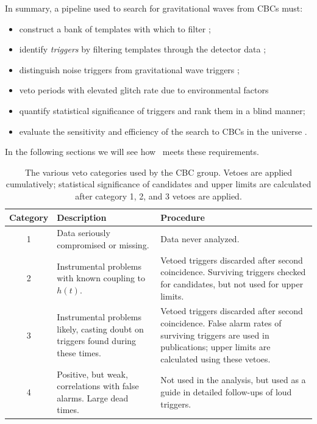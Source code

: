 In summary, a pipeline used to search for gravitational waves from \acp{CBC} must:
\begin{itemize}
\item{construct a bank of templates with which to filter \cite{Owen:1998dk, Tanaka:2000, BBCCS:2006, hexabank};}
\item{identify \emph{triggers} by filtering templates through the detector data \cite{Brown};}
\item{distinguish noise triggers from gravitational wave triggers \cite{Allen:2004};}
\item{veto periods with elevated glitch rate due to environmental factors \cite{Slutsky:2010ff, Christensen:2010}}
\item{quantify statistical significance of triggers and rank them in a blind manner;}
\item{evaluate the sensitivity and efficiency of the search to \acp{CBC} in the universe \cite{Collaboration:2009tt, Abbott:2009qj, Collaboration:S6CBClowmass}.}
\end{itemize}
In the following sections we will see how \ihope~meets these requirements.

\begin{table}
\label{tab:veto_cats}
\center
\begin{tabular}{c | p{5cm} | p{8cm}}
Category    &    Description    &   Procedure    \\
\hline
    1       &    Data seriously compromised or missing.    &    Data never analyzed. \\
\hline
    2       &    Instrumental problems with known coupling to $h(t)$.    &    Vetoed triggers discarded after second coincidence. Surviving triggers checked for candidates, but not used for upper limits. \\
\hline
    3       &    Instrumental problems likely, casting doubt on triggers found during these times.    &    Vetoed triggers discarded after second coincidence. False alarm rates of surviving triggers are used in publications; upper limits are calculated using these vetoes.  \\
\hline
    4       &    Positive, but weak, correlations with false alarms. Large dead times.    &     Not used in the analysis, but used as a guide in detailed follow-ups of loud triggers. \\
\end{tabular}

\caption{The various veto categories used by the CBC group. Vetoes are applied cumulatively; statistical significance of candidates and upper limits are calculated after category 1, 2, and 3 vetoes are applied.}
\end{table}

